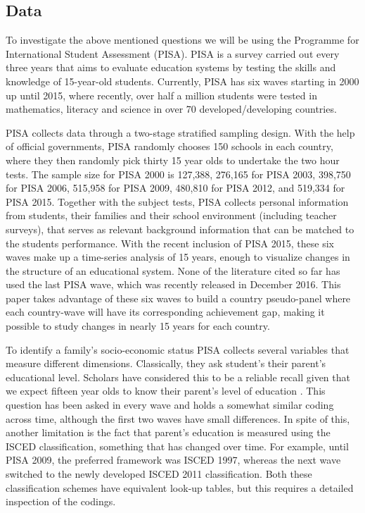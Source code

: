 \documentclass[11pt, a4paper]{article}\usepackage[]{graphicx}\usepackage[]{color}
\begin{document}
\subsection{Data}



To investigate the above mentioned questions we will be using the Programme for International Student Assessment (PISA). PISA is a survey carried out every three years that aims to evaluate education systems by testing the skills and knowledge of 15-year-old students. Currently, PISA has six waves starting in 2000 up until 2015, where recently, over half a million students were tested in mathematics, literacy and science in over 70 developed/developing countries.

PISA collects data through a two-stage stratified sampling design. With the help of official governments, PISA randomly chooses 150 schools in each country, where they then randomly pick thirty 15 year olds to undertake the two hour tests. The sample size for PISA 2000 is 127,388, 276,165 for PISA 2003, 398,750 for PISA 2006, 515,958 for PISA 2009, 480,810 for PISA 2012, and 519,334 for PISA 2015. Together with the subject tests, PISA collects personal information from students, their families and their school environment (including teacher surveys), that serves as relevant background information that can be matched to the students performance. With the recent inclusion of PISA 2015, these six waves make up a time-series analysis of 15 years, enough to visualize changes in the structure of an educational system. None of the literature cited so far has used the last PISA wave, which was recently released in December 2016. This paper takes advantage of these six waves to build a country pseudo-panel where each country-wave will have its corresponding achievement gap, making it possible to study changes in nearly 15 years for each country.

To identify a family's socio-economic status PISA collects several variables that measure different dimensions. Classically, they ask student's their parent's educational level. Scholars have considered this to be a reliable recall given that we expect fifteen year olds to know their parent's level of education \citep{reardon2011}. This question has been asked in every wave and holds a somewhat similar coding across time, although the first two waves have small differences. In spite of this, another limitation is the fact that parent's education is measured using the ISCED classification, something that has changed over time. For example, until PISA 2009, the preferred framework was ISCED 1997, whereas the next wave switched to the newly developed ISCED 2011 classification. Both these classification schemes have equivalent look-up tables, but this requires a detailed inspection of the codings.
\end{document}
